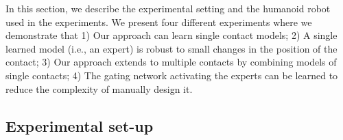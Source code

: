  In this section, we describe the experimental setting and the humanoid robot~\robot{} used in the experiments.
%
We present four different experiments where we demonstrate that
1) Our approach can learn single contact models;
2) A single learned model (i.e., an expert) is robust to small changes in the position of the contact;
3) Our approach extends to multiple contacts by combining models of single contacts;
4) The gating network activating the experts can be learned to reduce the complexity of manually design it.



	

	

\subsection{Experimental set-up}

